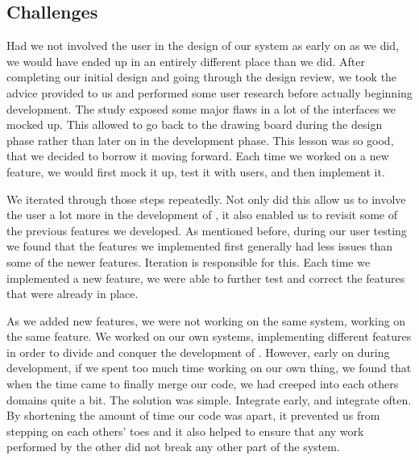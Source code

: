\subsection{Challenges}
Had we not involved the user in the design of our system as early on as we did, we would have ended up in an entirely different place than we did. After completing our initial design and going through the design review, we took the advice provided to us and performed some user research before actually beginning development. The study exposed some major flaws in a lot of the interfaces we mocked up. This allowed to go back to the drawing board during the design phase rather than later on in the development phase. This lesson was so good, that we decided to borrow it moving forward. Each time we worked on a new feature, we would first mock it up, test it with users, and then implement it. 
\par We iterated through those steps repeatedly. Not only did this allow us to involve the user a lot more in the development of \projectTitle, it also enabled us to revisit some of the previous features we developed. As mentioned before, during our user testing we found that the features we implemented first generally had less issues than some of the newer features. Iteration is responsible for this. Each time we implemented a new feature, we were able to further test and correct the features that were already in place. 
\par As we added new features, we were not working on the same system, working on the same feature. We worked on our own systems, implementing different features in order to divide and conquer the development of \projectTitle. However, early on during development, if we spent too much time working on our own thing, we found that when the time came to finally merge our code, we had creeped into each others domains quite a bit. The solution was simple. Integrate early, and integrate often. By shortening the amount of time our code was apart, it prevented us from stepping on each others' toes and it also helped to ensure that any work performed by the other did not break any other part of the system. 

